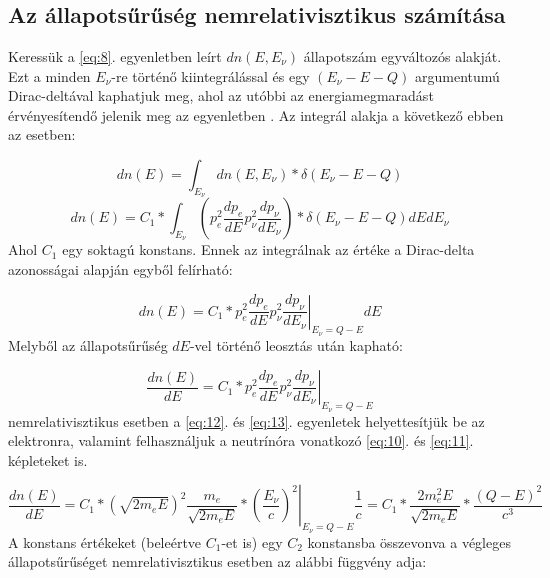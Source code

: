 \appendix
\renewcommand{\thesection}{APPENDIX \Alph{section}}

\section{} \label{appendix:A}

\subsection{Az állapotsűrűség nemrelativisztikus számítása}
Keressük a \ref{eq:8}. egyenletben leírt $dn \left( E, E_{\nu} \right)$ állapotszám egyváltozós alakját. Ezt a minden $E_{\nu}$-re történő kiintegrálással és egy $\left( E_{\nu} - E - Q \right)$ argumentumú Dirac-deltával kaphatjuk meg, ahol az utóbbi az energiamegmaradást érvényesítendő jelenik meg az egyenletben \citep{akos}. Az integrál alakja a következő ebben az esetben:

\begin{equation} \label{eq:19}
dn \left( E \right)
=
\int_{E_{\nu}} dn \left( E, E_{\nu} \right) * \delta \left( E_{\nu} - E - Q \right)
\end{equation}
\begin{equation} \label{eq:20}
dn \left( E \right)
=
C_{1} * \int_{E_{\nu}} \left( p_{e}^{2} \frac{dp_{e}}{dE} p_{\nu}^{2} \frac{dp_{\nu}}{dE_{\nu}} \right) * \delta \left( E_{\nu} - E - Q \right) dE dE_{\nu}
\end{equation}
Ahol $C_{1}$ egy soktagú konstans. Ennek az integrálnak az értéke a Dirac-delta azonosságai alapján egyből felírható:

\begin{equation} \label{eq:21}
dn \left( E \right)
=
C_{1} * \left. p_{e}^{2} \frac{dp_{e}}{dE} p_{\nu}^{2} \frac{dp_{\nu}}{dE_{\nu}} \right|_{E_{\nu} = Q - E} dE
\end{equation}
Melyből az állapotsűrűség $dE$-vel történő leosztás után kapható:

\begin{equation} \label{eq:22}
\frac{dn \left( E \right)}{dE}
=
C_{1} * \left. p_{e}^{2} \frac{dp_{e}}{dE} p_{\nu}^{2} \frac{dp_{\nu}}{dE_{\nu}} \right|_{E_{\nu} = Q - E}
\end{equation}
nemrelativisztikus esetben a \ref{eq:12}. és \ref{eq:13}. egyenletek helyettesítjük be az elektronra, valamint felhasználjuk a neutrínóra vonatkozó \ref{eq:10}. és \ref{eq:11}. képleteket is.

\begin{equation} \label{eq:23}
\frac{dn \left( E \right)}{dE}
=
C_{1} * \left( \sqrt{2 m_{e} E} \right)^{2} \frac{m_{e}}{\sqrt{2 m_{e} E}} * \left. \left( \frac{E_{\nu}}{c} \right)^{2} \right|_{E_{\nu} = Q - E} \frac{1}{c}
=
C_{1} * \frac{2 m_{e}^{2} E}{\sqrt{2 m_{e} E}} * \frac{\left( Q - E \right)^{2}}{c^{3}}
\end{equation}
A konstans értékeket (beleértve $C_{1}$-et is) egy $C_{2}$ konstansba összevonva a végleges állapotsűrűséget nemrelativisztikus esetben az alábbi függvény adja:


